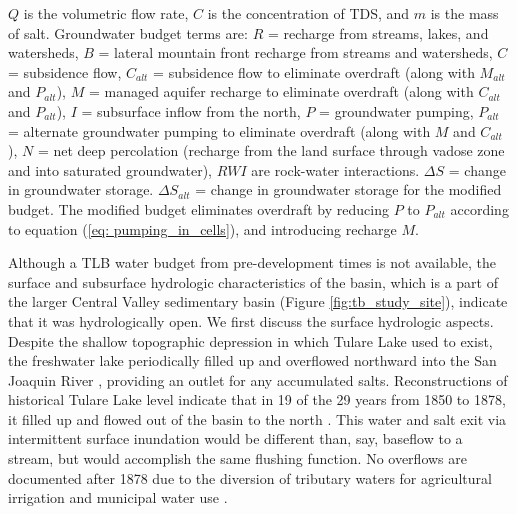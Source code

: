 \begin{threeparttable}
\begin{table}[H]
		$Q$ is the volumetric flow rate, $C$ is the concentration of TDS, and $m$ is the mass of salt. Groundwater budget terms are:
		$R$ = recharge from streams, lakes, and watersheds, 
		$B$ = lateral mountain front recharge from streams and watersheds,
		$C$ = subsidence flow,
		$C_{alt}$ = subsidence flow to eliminate overdraft (along with $M_{alt}$ and $P_{alt}$),
		$M$ = managed aquifer recharge to eliminate overdraft (along with $C_{alt}$ and $P_{alt}$), 
		$I$ = subsurface inflow from the north,
		$P$ = groundwater pumping,
		$P_{alt}$ = alternate groundwater pumping to eliminate overdraft (along with $M$ and $C_{alt}$),
		$N$ = net deep percolation (recharge from the land surface through vadose zone and into saturated groundwater),
		$RWI$ are rock-water interactions.
		$\Delta S$ = change in groundwater storage.
		$\Delta S_{alt}$ = change in groundwater storage for the modified budget. 
		The modified budget eliminates overdraft by reducing $P$ to $P_{alt}$ according to equation (\ref{eq: pumping_in_cells}), and introducing recharge $M$. 
		
	\end{table}
	
\end{threeparttable}

\egroup


Although a TLB water budget from pre-development times is not available, the surface and subsurface hydrologic characteristics of the basin, which is a part of the larger Central Valley sedimentary basin (Figure \ref{fig:tb_study_site}), indicate that it was hydrologically open. We first discuss the surface hydrologic aspects. Despite the shallow topographic depression in which Tulare Lake used to exist, the freshwater lake periodically filled up and overflowed northward into the San Joaquin River \citep{grunsky1898irrigation, Davis1959}, providing an outlet for any accumulated salts. Reconstructions of historical Tulare Lake level indicate that in 19 of the 29 years from 1850 to 1878, it filled up and flowed out of the basin to the north \citep{USBR1970}. This water and salt exit via intermittent surface inundation would be different than, say, baseflow to a stream, but would accomplish the same flushing function. No overflows are documented after 1878 due to the diversion of tributary waters for agricultural irrigation and municipal water use \citep{ecorp2007}. 

